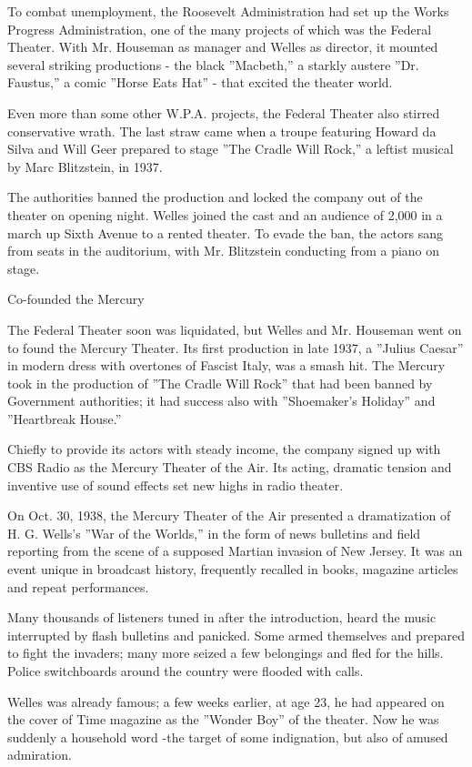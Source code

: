 To combat unemployment, the Roosevelt Administration had set up the
Works Progress Administration, one of the many projects of which was the
Federal Theater. With Mr. Houseman as manager and Welles as director, it
mounted several striking productions - the black ''Macbeth,'' a starkly
austere ''Dr. Faustus,'' a comic ''Horse Eats Hat'' - that excited the
theater world.

Even more than some other W.P.A. projects, the Federal Theater also
stirred conservative wrath. The last straw came when a troupe featuring
Howard da Silva and Will Geer prepared to stage ''The Cradle Will
Rock,'' a leftist musical by Marc Blitzstein, in 1937.

The authorities banned the production and locked the company out of the
theater on opening night. Welles joined the cast and an audience of
2,000 in a march up Sixth Avenue to a rented theater. To evade the ban,
the actors sang from seats in the auditorium, with Mr. Blitzstein
conducting from a piano on stage.

Co-founded the Mercury

The Federal Theater soon was liquidated, but Welles and Mr. Houseman
went on to found the Mercury Theater. Its first production in late 1937,
a ''Julius Caesar'' in modern dress with overtones of Fascist Italy, was
a smash hit. The Mercury took in the production of ''The Cradle Will
Rock'' that had been banned by Government authorities; it had success
also with ''Shoemaker's Holiday'' and ''Heartbreak House.''

Chiefly to provide its actors with steady income, the company signed up
with CBS Radio as the Mercury Theater of the Air. Its acting, dramatic
tension and inventive use of sound effects set new highs in radio
theater.

On Oct. 30, 1938, the Mercury Theater of the Air presented a
dramatization of H. G. Wells's ''War of the Worlds,'' in the form of
news bulletins and field reporting from the scene of a supposed Martian
invasion of New Jersey. It was an event unique in broadcast history,
frequently recalled in books, magazine articles and repeat performances.

Many thousands of listeners tuned in after the introduction, heard the
music interrupted by flash bulletins and panicked. Some armed themselves
and prepared to fight the invaders; many more seized a few belongings
and fled for the hills. Police switchboards around the country were
flooded with calls.

Welles was already famous; a few weeks earlier, at age 23, he had
appeared on the cover of Time magazine as the ''Wonder Boy'' of the
theater. Now he was suddenly a household word -the target of some
indignation, but also of amused admiration.

